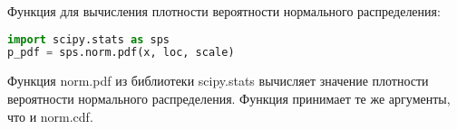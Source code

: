 Функция для вычисления плотности вероятности нормального распределения:
\begin{lstlisting}[language=Python]
import scipy.stats as sps
p_pdf = sps.norm.pdf(x, loc, scale)
\end{lstlisting}

Функция norm.pdf из библиотеки scipy.stats вычисляет значение плотности вероятности нормального распределения. 
Функция принимает те же аргументы, что и norm.cdf.

%
%
%
%
%
%
